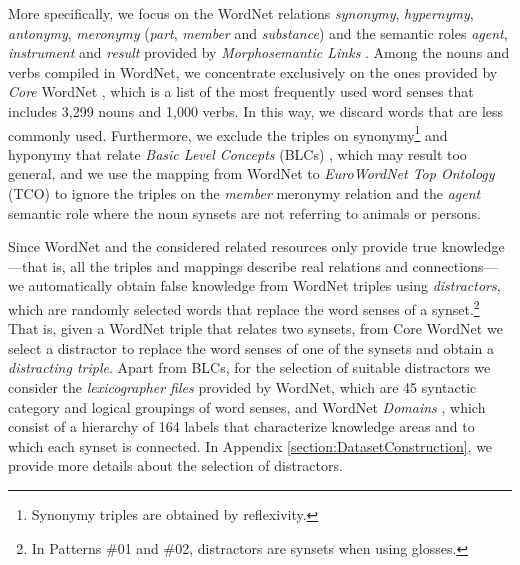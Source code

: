 \documentclass[11pt]{article}
\newcommand{\WORDNET}{WordNet}
\begin{document}
More specifically, we focus on the \WORDNET{} relations {\it synonymy}, {\it hypernymy}, {\it antonymy}, {\it meronymy} ({\it part}, {\it member} and {\it substance}) and the semantic roles {\it agent}, {\it instrument} and {\it result} provided by {\it Morphosemantic Links} \cite{FOC09}. Among the nouns and verbs compiled in \WORDNET{}, we concentrate exclusively on the ones provided by {\it Core} \WORDNET{} \cite{boydgraber2006adding}, which is a list of the most frequently used word senses that includes 3,299 nouns and 1,000 verbs. In this way, we discard words that are less commonly used. Furthermore, we exclude the triples on synonymy\footnote{Synonymy triples are obtained by reflexivity.} and hyponymy that relate {\it Basic Level Concepts} (BLCs) \cite{izquierdo2007exploring}, which may result too general, and we use the mapping from \WORDNET{} to {\it EuroWordNet Top Ontology} (TCO) to ignore the triples on the {\it member} meronymy relation and the {\it agent} semantic role where the noun synsets are not referring to animals or persons.

Since \WORDNET{} and the considered related resources only provide true knowledge ---that is, all the triples and mappings describe real relations and connections--- we automatically obtain false knowledge from \WORDNET{} triples using {\it distractors}, which are randomly selected words that replace the word senses of a synset.\footnote{In Patterns \#01 and \#02, distractors are synsets when using glosses.} That is, given a \WORDNET{} triple that relates two synsets, from Core \WORDNET{} we select a distractor to replace the word senses of one of the synsets and obtain a {\it distracting triple}. Apart from BLCs, for the selection of suitable distractors we consider the {\it lexicographer files} provided by \WORDNET{}, which are 45 syntactic category and logical groupings of word senses, and \WORDNET{} {\it Domains} \cite{bentivogli2004revising}, which consist of a hierarchy of 164 labels that characterize knowledge areas and to which each synset is connected. In Appendix \ref{section:DatasetConstruction}, we provide more details about the selection of distractors.
\end{document}
